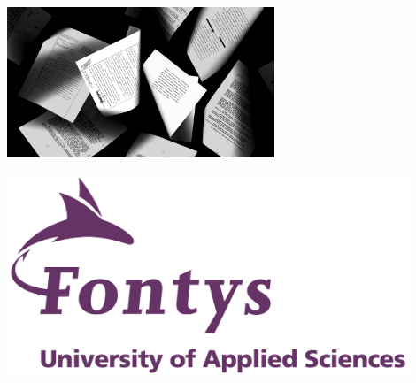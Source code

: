 \begin{titlepage}
    \begin{center}
        \vspace*{0.1cm}

        \Huge
        \textbf{\documentTitle}

        \vspace{0.3cm}
        \LARGE
        \documentSubtitle\\

        \vspace*{1.5cm}
        \includegraphics[width=0.6\textwidth]{images/books.jpg}

        \vspace*{3.5cm}
        \begin{minipage}{0.5\textwidth}
            \centering
        \end{minipage}%
        \begin{minipage}{0.5\textwidth}
            \centering
            \includegraphics[width=0.9\textwidth]{images/fontys_logo.png}
        \end{minipage}%
    \end{center}
    \vfill


\end{titlepage}

